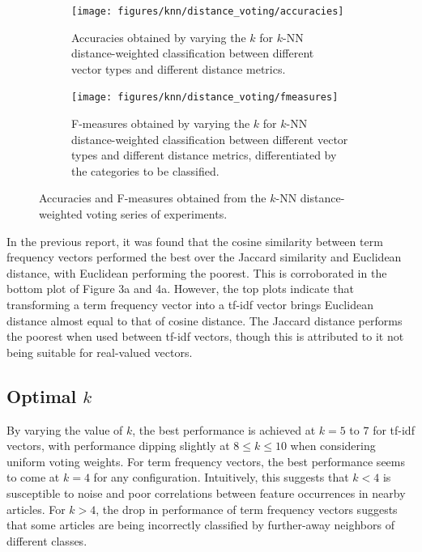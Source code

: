 \documentclass[11pt]{article}
\begin{document}
\begin{figure}[h!] \label{fig:perf_knn_distance}
	\centering
	\begin{subfigure}{.5\textwidth}
	  \centering
	  \texttt{[image: figures/knn/distance\_voting/accuracies]}
	  \caption{Accuracies obtained by varying the $k$ for $k$-NN\\
	   distance-weighted classification between different \\
	   vector types and different distance metrics.}
	  \label{fig:knn_accuracies}
	\end{subfigure}%
	\begin{subfigure}{.5\textwidth}
	  \centering
	  \texttt{[image: figures/knn/distance\_voting/fmeasures]}
	  \caption{F-measures obtained by varying the $k$ for $k$-NN\\
	   distance-weighted classification between different vector types and different distance metrics, differentiated by the categories to be classified.}
	  \label{fig:knn_fmeasures}
	\end{subfigure}
	\caption{Accuracies and F-measures obtained from the $k$-NN distance-weighted voting series of experiments.}
\end{figure}

In the previous report, it was found that the cosine similarity between term frequency vectors performed the best over the Jaccard similarity and Euclidean distance, with Euclidean performing the poorest.
This is corroborated in the bottom plot of Figure 3a and 4a.
However, the top plots indicate that transforming a term frequency vector into a tf-idf vector brings Euclidean distance almost equal to that of cosine distance.
The Jaccard distance performs the poorest when used between tf-idf vectors, though this is attributed to it not being suitable for real-valued vectors.

\subsection{Optimal $k$}

By varying the value of $k$, the best performance is achieved at $k=5$ to $7$ for tf-idf vectors, with performance dipping slightly at $8 \le k \le 10$ when considering uniform voting weights.
For term frequency vectors, the best performance seems to come at $k=4$ for any configuration.
Intuitively, this suggests that $k<4$ is susceptible to noise and poor correlations between feature occurrences in nearby articles.
For $k>4$, the drop in performance of term frequency vectors suggests that some articles are being incorrectly classified by further-away neighbors of different classes.
\end{document}
